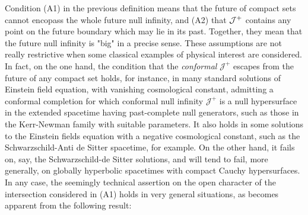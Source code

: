 Condition (A1) in the previous definition means that the future of compact sets cannot encopass the whole future null infinity, and (A2) that ${\cal J}^+$ contains any point on the future boundary which may lie in its past. Together, they mean that the future null infinity is "big" in a precise sense. These assumptions are not really restrictive when some classical examples of physical interest are considered. In fact, on the one hand, the condition that the {\em conformal} $\mathcal{J}^+$ escapes from the future of any compact set holds, for instance, in many standard solutions of Einstein field equation, with vanishing cosmological constant, admitting a conformal completion for which conformal null infinity $\mathcal{J}^+$ is a null hypersurface in the extended spacetime having past-complete null generators, such as those in the Kerr-Newman family with suitable parameters. It also holds in some solutions to the Einstein fields equation with a negative cosmological constant, such as the Schwarzschild-Anti de Sitter spacetime, for example. On the other hand, it fails on, say, the Schwarzschild-de Sitter solutions, and will tend to fail, more generally, on globally hyperbolic spacetimes with compact Cauchy hypersurfaces. In any case, the seemingly technical assertion on the open character of the intersection considered in (A1) holds in very general situations, as becomes apparent from the following result:




